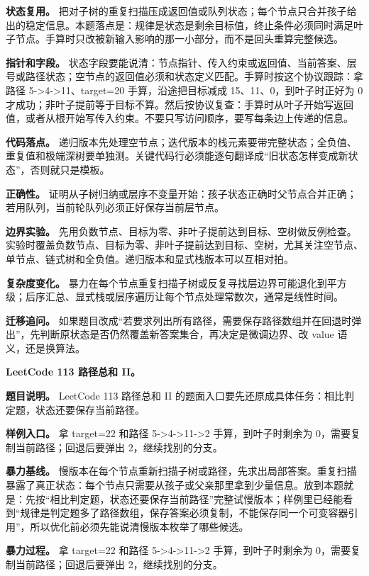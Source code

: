 \textbf{状态复用。} 把对子树的重复扫描压成返回值或队列状态；每个节点只合并孩子给出的稳定信息。本题落点是：规律是状态是剩余目标值，终止条件必须同时满足叶子节点。手算时只改被新输入影响的那一小部分，而不是回头重算完整候选。

\textbf{指针和字段。} 状态字段要能说清：节点指针、传入约束或返回值、当前答案、层号或路径状态；空节点的返回值必须和状态定义匹配。手算时按这个协议跟踪：拿路径 5->4->11、target=20 手算，沿途把目标减成 15、11、0，到叶子时正好为 0 才成功；非叶子提前等于目标不算。然后按协议复查：手算时从叶子开始写返回值，或者从根开始写传入约束。不要只写访问顺序，要写每条边上传递的信息。

\textbf{代码落点。} 递归版本先处理空节点；迭代版本的栈元素要带完整状态；全负值、重复值和极端深树要单独测。关键代码行必须能逐句翻译成“旧状态怎样变成新状态”，否则就只是模板。

\textbf{正确性。} 证明从子树归纳或层序不变量开始：孩子状态正确时父节点合并正确；若用队列，当前轮队列必须正好保存当前层节点。

\textbf{边界实验。} 先用负数节点、目标为零、非叶子提前达到目标、空树做反例检查。实验时覆盖负数节点、目标为零、非叶子提前达到目标、空树，尤其关注空节点、单节点、链式树和全负值。递归版本和显式栈版本可以互相对拍。

\textbf{复杂度变化。} 暴力在每个节点重复扫描子树或反复寻找层边界可能退化到平方级；后序汇总、显式栈或层序遍历让每个节点处理常数次，通常是线性时间。

\textbf{迁移追问。} 如果题目改成“若要求列出所有路径，需要保存路径数组并在回退时弹出”，先判断原状态是否仍然覆盖新答案集合，再决定是微调边界、改 value 语义，还是换算法。

\noindent\textbf{LeetCode 113 路径总和 II。}

\textbf{题目说明。} LeetCode 113 路径总和 II 的题面入口要先还原成具体任务：相比判定题，状态还要保存当前路径。

\textbf{样例入口。} 拿 target=22 和路径 5->4->11->2 手算，到叶子时剩余为 0，需要复制当前路径；回退后要弹出 2，继续找别的分支。

\textbf{暴力基线。} 慢版本在每个节点重新扫描子树或路径，先求出局部答案。重复扫描暴露了真正状态：每个节点只需要从孩子或父亲那里拿到少量信息。放到本题就是：先按“相比判定题，状态还要保存当前路径”完整试慢版本；样例里已经能看到“规律是判定题多了路径数组，保存答案必须复制，不能保存同一个可变容器引用”，所以优化前必须先能说清慢版本枚举了哪些候选。

\textbf{暴力过程。} 拿 target=22 和路径 5->4->11->2 手算，到叶子时剩余为 0，需要复制当前路径；回退后要弹出 2，继续找别的分支。

